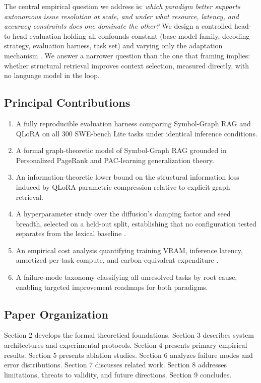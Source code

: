 \documentclass[10pt,twocolumn,letterpaper]{article}
\begin{document}
The central empirical question we address is: \textit{which paradigm better supports autonomous issue resolution at scale, and under what resource, latency, and accuracy constraints does one dominate the other?} We design a controlled head-to-head evaluation holding all confounds constant (base model family, decoding strategy, evaluation harness, task set) and varying only the adaptation mechanism \cite{arxiv_2203_11171}. We answer a narrower question than the one that framing implies: whether structural retrieval improves context selection, measured directly, with no language model in the loop.


\subsection{Principal Contributions}


\begin{enumerate}
  \item A fully reproducible evaluation harness comparing Symbol-Graph RAG and QLoRA on all 300 SWE-bench Lite tasks under identical inference conditions.
  \item A formal graph-theoretic model of Symbol-Graph RAG grounded in Personalized PageRank and PAC-learning generalization theory.
  \item An information-theoretic lower bound on the structural information loss induced by QLoRA parametric compression relative to explicit graph retrieval.
  \item A hyperparameter study over the diffusion's damping factor and seed breadth, selected on a held-out split, establishing that no configuration tested separates from the lexical baseline \cite{arxiv_2308_12898}.
  \item An empirical cost analysis quantifying training VRAM, inference latency, amortized per-task compute, and carbon-equivalent expenditure \cite{arxiv_2406_00584}.
  \item A failure-mode taxonomy classifying all unresolved tasks by root cause, enabling targeted improvement roadmaps for both paradigms.
\end{enumerate}


\subsection{Paper Organization}


Section 2 develops the formal theoretical foundations. Section 3 describes system architectures and experimental protocols. Section 4 presents primary empirical results. Section 5 presents ablation studies. Section 6 analyzes failure modes and error distributions. Section 7 discusses related work. Section 8 addresses limitations, threats to validity, and future directions. Section 9 concludes.
\end{document}
